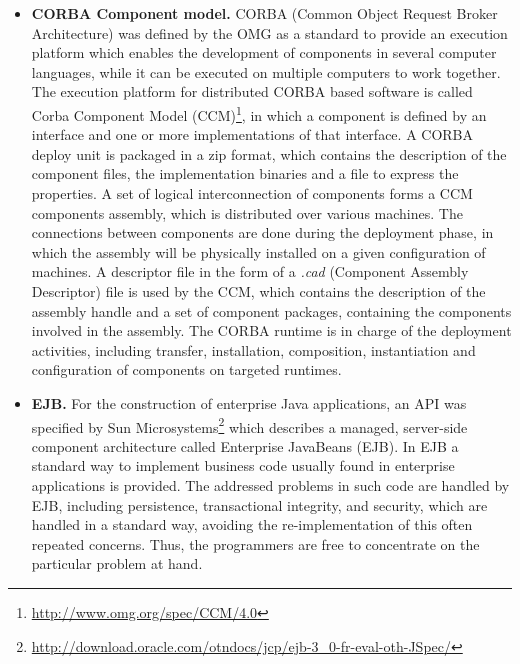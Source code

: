 \begin{itemize}
	\item \textbf{CORBA Component model.}
	CORBA (Common Object Request Broker Architecture) was defined by the OMG as a standard to provide an execution platform which enables the development of components in several computer languages, while it can be executed on multiple computers to work together.
	The execution platform for distributed CORBA based software is called Corba Component Model (CCM)\footnote{\url{http://www.omg.org/spec/CCM/4.0}}, in which a component is defined by an interface and one or more implementations of that interface.
	A CORBA deploy unit is packaged in a zip format, which contains the description of the component files, the implementation binaries and a file to express the properties.
	A set of logical interconnection of components forms a CCM components assembly, which is distributed over various machines.
	The connections between components are done during the deployment phase, in which the assembly will be physically installed on a given configuration of machines.
	A descriptor file in the form of a \textit{.cad} (Component Assembly Descriptor) file is used by the CCM, which contains the description of the assembly handle and a set of component packages, containing the components involved in the assembly.
	The CORBA runtime is in charge of the deployment activities, including transfer, installation, composition, instantiation and configuration of components on targeted runtimes.
	
	\item \textbf{EJB.}
	For the construction of enterprise Java applications, an API was specified by Sun Microsystems\footnote{\url{http://download.oracle.com/otndocs/jcp/ejb-3_0-fr-eval-oth-JSpec/}} which describes a managed, server-side component architecture called Enterprise JavaBeans (EJB).
	In EJB a standard way to implement business code usually found in enterprise applications is provided.
	The addressed problems in such code are handled by EJB, including persistence, transactional integrity, and security, which are handled in a standard way, avoiding the re-implementation of this often repeated concerns.
	Thus, the programmers are free to concentrate on the particular problem at hand.
	

\end{itemize}
